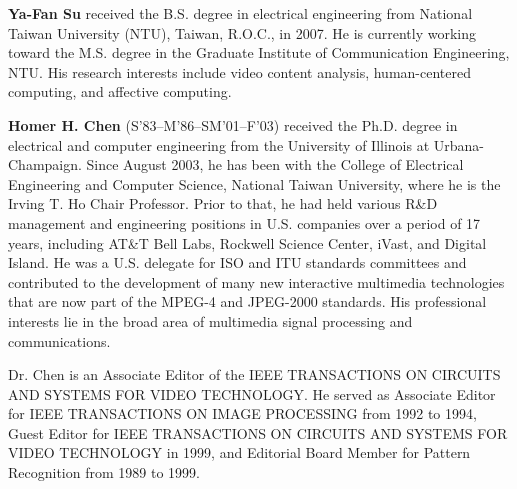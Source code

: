 \documentclass[journal, twoside]{IEEEtran}
\begin{document}
\begin{IEEEbiography}{\bf Ya-Fan Su}
 received the B.S. degree in electrical engineering from National Taiwan University (NTU),
Taiwan, R.O.C., in 2007. He is currently working
toward the M.S. degree in the Graduate Institute of
Communication Engineering, NTU.
His research interests include video content
analysis, human-centered computing, and affective
computing.
\end{IEEEbiography}

\begin{IEEEbiography}{\bf Homer H. Chen}
(S’83–M’86–SM’01–F’03) received the Ph.D. degree in electrical and computer
engineering from the University of Illinois at
Urbana-Champaign.
Since August 2003, he has been with the College
of Electrical Engineering and Computer Science,
National Taiwan University, where he is the Irving T.
Ho Chair Professor. Prior to that, he had held various
R&D management and engineering positions in
U.S. companies over a period of 17 years, including
AT&T Bell Labs, Rockwell Science Center, iVast,
and Digital Island. He was a U.S. delegate for ISO and ITU standards committees and contributed to the development of many new interactive multimedia
technologies that are now part of the MPEG-4 and JPEG-2000 standards. His
professional interests lie in the broad area of multimedia signal processing and
communications.

Dr. Chen is an Associate Editor of the IEEE TRANSACTIONS ON CIRCUITS AND
SYSTEMS FOR VIDEO TECHNOLOGY. He served as Associate Editor for IEEE
TRANSACTIONS ON IMAGE PROCESSING from 1992 to 1994, Guest Editor for
IEEE TRANSACTIONS ON CIRCUITS AND SYSTEMS FOR VIDEO TECHNOLOGY in
1999, and Editorial Board Member for Pattern Recognition from 1989 to 1999.
\end{IEEEbiography}
\end{document}
